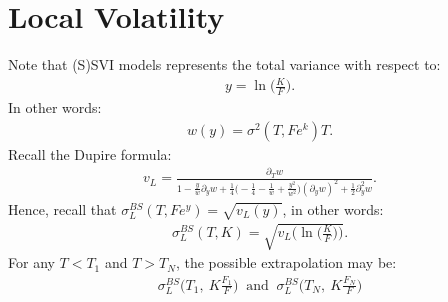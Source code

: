 \documentclass[a4paper, 11pt]{article}              %
\numberwithin{equation}{section}
\theoremstyle{plain}
\newcommand{\1}{\mathds{1}}
\theoremstyle{plain}
\theoremstyle{definition}
\theoremstyle{plain}
\begin{document}
\section{Local Volatility}
Note that (S)SVI models represents the total variance with respect to:
\begin{align}
y = \ln\big(\frac{K}{F}\big).
\end{align}
In other words:
\begin{align}
  w(y) = \sigma^2(T, Fe^k)T. 
\end{align}
Recall the Dupire formula:
\begin{align}
  v_L = \frac{\partial_T w}{1-\frac{y}{w}\partial_y w
  +\frac{1}{4}\Big(-\frac{1}{4} - \frac{1}{w} +
  \frac{y^2}{w^2}\Big)(\partial_y w)^2 + \frac{1}{2}\partial^2_y w}.
\end{align}
Hence, recall that $\sigma^{BS}_L(T, Fe^y) = \sqrt{v_L(y)}$, in other words:
\begin{align}
 \sigma^{BS}_L(T, K) = \sqrt{v_L\bigg(\ln\big(\frac{K}{F}\big)\bigg)}.
\end{align}
For any $T <  T_1$ and $T >  T_N$, the possible extrapolation may be:
\begin{align}
  \sigma^{BS}_L\bigg(T_1, ~K\frac{F_1}{F}\bigg) ~\text{ and }~ \sigma^{BS}_L\bigg(T_N, ~K\frac{F_N}{F}\bigg)
\end{align}
\end{document}
